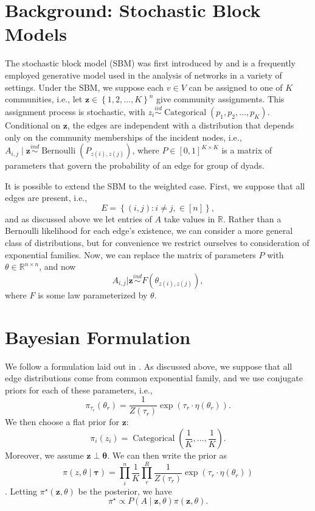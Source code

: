 \documentclass[11pt]{article}   %
\newcommand{\V}[1]{\ensuremath{\boldsymbol{#1}}}
\newcommand{\M}[1]{\ensuremath{#1}}
\begin{document}
\section{Background: Stochastic Block Models}
\label{sec:backgr-stoch-block}
The stochastic block model (SBM) was first introduced by \textcite{holland_stochastic_1983} and is a frequently employed generative model used in the analysis of networks in a variety of settings.
Under the SBM, we suppose each $v \in V$ can be assigned to one of $K$ communities, i.e., let $\V{z} \in \left\{ 1, 2, \ldots, K \right\}^n$ give community assignments.
This assignment process is stochastic, with $z_i \overset{iid}{\sim} \operatorname{Categorical}(p_1, p_2, \ldots, p_K)$.
Conditional on $\V{z}$, the edges are independent with a distribution that depends only on the community memberships of the incident nodes, i.e., $\M{A}_{i,j} \mid \V{z} \overset{ind}{\sim} \operatorname{Bernoulli}(\M{P}_{z(i),z(j)})$, where
$\M{P} \in \left[ 0, 1 \right]^{K \times K}$ is a matrix of parameters that govern the probability of an edge for group of dyads.

It is possible to extend the SBM to the weighted case.
First, we suppose that all edges are present, i.e.,
$$E = \left\{ (i,j) : i \neq j, \in [n] \right\},$$ and as discussed above we let entries of $A$ take values in $\mathbb{R}$.
Rather than a Bernoulli likelihood for each edge's existence, we can consider a more general class of distributions, but for convenience we restrict ourselves to consideration of exponential families.
Now, we can replace the matrix of parameters $P$ with $\theta \in \mathbb{R}^{n \times n}$, and now $$\M{A}_{i,j} | \V{z} \overset{ind}{\sim} F(\M{\theta}_{z(i),z(j)}),$$ where $F$ is some law parameterized by $\M{\theta}$.




\section{Bayesian Formulation}
\label{sec:bayesian-formulation}

We follow a formulation laid out in \textcite{aicher_adapting_2013,aicher_learning_2015}.
As discussed above, we suppose that all edge distributions come from common exponential family, and we use conjugate priors for each of these parameters, i.e.,
\begin{equation*}
\pi_{\tau_r}(\theta_r) = \frac{1}{Z(\tau_r)} \exp(\tau_r \cdot  \eta(\theta_r)).
\end{equation*}
We then choose a flat prior for $\V{z}$:
\begin{equation*}
\pi_i(z_i) = \operatorname{Categorical}\left( \frac{1}{K}, \ldots, \frac{1}{K} \right).\label{eq:1}
\end{equation*}
Moreover, we assume $\V{z} \perp \V{\theta}$.
We can then write the prior as
$$\pi(z, \theta \mid \V{\tau}) = \prod_i^n \frac{1}{K} \prod_r^R \frac{1}{Z(\tau_r)} \exp( \tau_r \cdot \eta(\theta_r))$$.
Letting $\pi^{\star}(\V{z}, \M{\theta})$ be the posterior, we have
\begin{equation*}
  \pi^{\star} \propto P(A \mid \V{z}, \M{\theta}) \pi(\V{z}, \M{\theta}).
\end{equation*}
\end{document}
